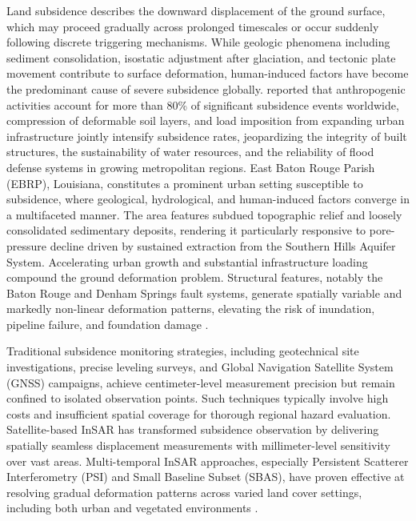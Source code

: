 \documentclass[oneside,doublespacing,flushright]{lsuthesis}
\begin{document}
Land subsidence describes the downward displacement of the ground surface, which may proceed gradually across prolonged timescales or occur suddenly following discrete triggering mechanisms. While geologic phenomena including sediment consolidation, isostatic adjustment after glaciation, and tectonic plate movement contribute to surface deformation, human-induced factors have become the predominant cause of severe subsidence globally. \citet{Higgins2016} reported that anthropogenic activities account for more than 80\% of significant subsidence events worldwide,
compression of deformable soil layers, and load imposition from expanding urban infrastructure jointly intensify subsidence rates, 
jeopardizing the integrity of built structures, the sustainability of water resources, and the reliability of flood defense systems in growing metropolitan regions.
East Baton Rouge Parish (EBRP), Louisiana, constitutes a prominent urban setting susceptible to subsidence, where geological, hydrological, and 
human-induced factors converge in a multifaceted manner. The area features subdued topographic relief and loosely consolidated sedimentary deposits, 
rendering it particularly responsive to pore-pressure decline driven by sustained extraction from the Southern Hills Aquifer System. Accelerating urban 
growth and substantial infrastructure loading compound the ground deformation problem. Structural features, notably the Baton Rouge and 
Denham Springs fault systems, generate spatially variable and markedly non-linear deformation patterns, elevating the risk of inundation, 
pipeline failure, and foundation damage \citep{Zou2016, Abdalla2024, Abdalla2026}.

Traditional subsidence monitoring strategies, including geotechnical site investigations, precise leveling surveys, and Global Navigation Satellite System (GNSS) campaigns, 
achieve centimeter-level measurement precision but remain confined to isolated observation points. Such techniques typically involve high costs and insufficient spatial coverage for thorough regional hazard evaluation. 
Satellite-based InSAR has transformed subsidence observation by delivering spatially seamless displacement measurements with millimeter-level sensitivity 
over vast areas. Multi-temporal InSAR approaches, especially Persistent Scatterer Interferometry (PSI) and Small Baseline Subset (SBAS), have proven effective at 
resolving gradual deformation patterns across varied land cover settings, including both urban and vegetated environments \citep{Ferretti2001, Berardino2002, Ferretti2011}.
\end{document}
